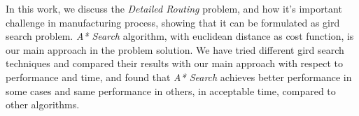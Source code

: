 In this work, we discuss the \emph{ Detailed Routing } problem, and how it's important challenge in manufacturing process, showing that it can be formulated as gird search problem.
\emph{A* Search} algorithm, with euclidean distance as cost function, is our main approach in the problem solution.
We have tried different gird search techniques and compared their results with our main approach with respect to performance and time, and found that
\emph{A* Search} achieves better performance in some cases and same performance in others, in acceptable time, compared to other algorithms.